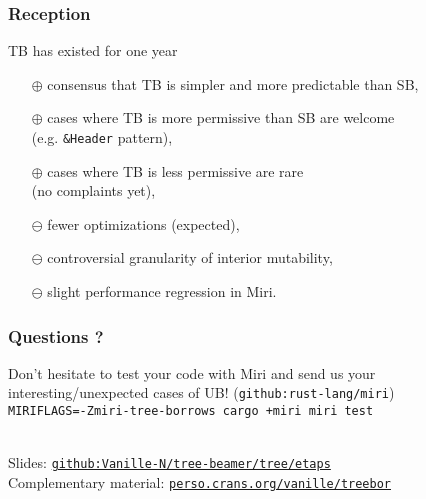 \begin{frame}
    \frametitle{Reception}
    TB has existed for one year
    \begin{itemize}
        \item[$\oplus$] consensus that TB is simpler and more predictable than SB,
        \item[$\oplus$] cases where TB is more permissive than SB are welcome \\ (e.g. \texttt{\&Header} pattern),
        \item[$\oplus$] cases where TB is less permissive are rare \\ (no complaints yet),
        \item[$\ominus$] fewer optimizations (expected),
        \item[$\ominus$] controversial granularity of interior mutability,
        \item[$\ominus$] slight performance regression in Miri.
    \end{itemize}
\end{frame}

\begin{frame}
    \frametitle{Questions ?}

    Don't hesitate to test your code with Miri and send us your
    interesting/unexpected cases of UB!
    (\texttt{github:rust-lang/miri}) \\
    {\color{blue} \texttt{MIRIFLAGS=-Zmiri-tree-borrows cargo +miri miri test}}\\~\\
    \vfill

    Slides: \href{https://github.com/Vanille-N/tree-beamer/tree/etaps}{\texttt{github:Vanille-N/tree-beamer/tree/etaps}}\\
    Complementary material: \href{https://perso.crans.org/vanille/treebor}{\texttt{perso.crans.org/vanille/treebor}}\\
\end{frame}
